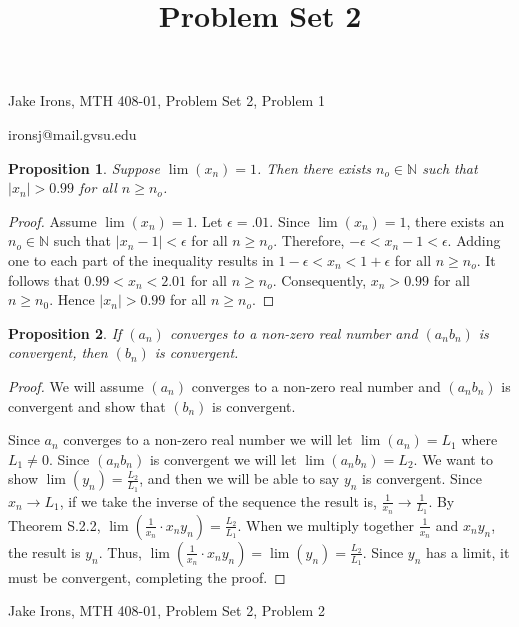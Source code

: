 \documentclass[11 pt]{article}
\title{Problem Set 2}
\newtheorem{proposition}{Proposition}
\newcommand{\newpar}{\vspace{.15in}\noindent}
\begin{document}
\noindent Jake Irons, MTH 408-01, Problem Set 2, Problem 1

\noindent ironsj@mail.gvsu.edu
\newpar
\begin{proposition}
Suppose $\lim(x_n)=1$. Then there exists $n_o\in\mathbb{N}$ such that $\mid x_n\mid>0.99$
for all $n \ge n_o$.
\end{proposition}
\begin{proof}
Assume $\lim(x_n)=1$. Let $\epsilon=.01$. Since $\lim(x_n)=1$, there exists an $n_o\in\mathbb{N}$ such
that $\mid x_n-1\mid<\epsilon$ for all $n\ge n_o$. Therefore, $-\epsilon<x_n-1<\epsilon$. Adding one to each part of the inequality results in $1-\epsilon<x_n<1+\epsilon$ for all $n\ge n_o$. It follows that $0.99 < x_n < 2.01$ for all $n\ge n_o$. Consequently, $x_n>0.99$ for all $n\ge n_0$. Hence $\mid x_n\mid>0.99$ for all $n\ge n_o$.
\end{proof}

\newpar
\begin{proposition}
If $(a_n)$ converges to a non-zero real number and $(a_nb_n)$ is convergent, then $(b_n)$ is convergent.
\end{proposition}
\begin{proof}
\newpar 
We will assume $(a_n)$ converges to a non-zero real number and $(a_nb_n)$ is convergent and show that $(b_n)$ is convergent. 

\newpar
Since $a_n$ converges to a non-zero real number we will let $\lim(a_n)=L_1$ where $L_1\ne0$. Since $(a_nb_n)$ is convergent we will let $\lim(a_nb_n)=L_2$. We want to show $\lim(y_n)=\frac{L_2}{L_1}$, and then we will be able to say $y_n$ is convergent. Since $x_n\rightarrow L_1$, if we take the inverse of the sequence the result is, $\frac{1}{x_n}\rightarrow \frac{1}{L_1}$. By Theorem S.2.2, $\lim(\frac{1}{x_n}\cdot x_ny_n)=\frac{L_2}{L_1}$. When we multiply together $\frac{1}{x_n}$ and $x_ny_n$, the result is $y_n$. Thus, $\lim(\frac{1}{x_n}\cdot x_ny_n)=\lim(y_n)=\frac{L_2}{L_1}$. Since $y_n$ has a limit, it must be convergent, completing the proof. 
\end{proof}
\newpage
\noindent Jake Irons, MTH 408-01, Problem Set 2, Problem 2
\end{document}
